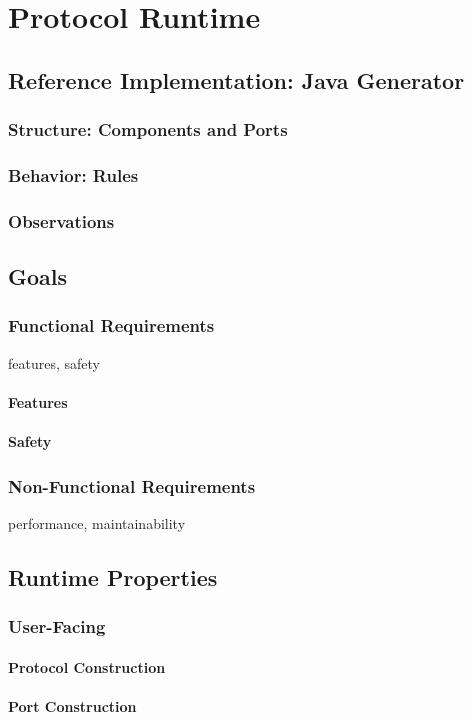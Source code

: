 \chapter{Protocol Runtime}
\section{Reference Implementation: Java Generator}
\subsection{Structure: Components and Ports}
\subsection{Behavior: Rules}
\subsection{Observations}
\section{Goals}
\subsection{Functional Requirements}
features, safety
\subsubsection{Features}
\subsubsection{Safety}
\subsection{Non-Functional Requirements}
performance, maintainability
\section{Runtime Properties}
\subsection{User-Facing}
\subsubsection{Protocol Construction}
\subsubsection{Port Construction}
